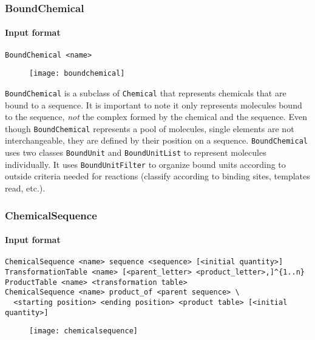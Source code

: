 \subsubsection{BoundChemical}

\paragraph{Input format}
\begin{verbatim}
BoundChemical <name>
\end{verbatim}

\begin{figure}[!ht]
	\centering
	\texttt{[image: boundchemical]}
\end{figure}

\texttt{BoundChemical} is a subclass of \texttt{Chemical} that represents chemicals that are bound to a sequence. It is important to note it only represents molecules bound to the sequence, \emph{not} the complex formed by the chemical and the sequence. Even though \texttt{BoundChemical} represents a pool of molecules, single elements are not interchangeable, they are defined by their position on a sequence. \texttt{BoundChemical} uses two classes \texttt{BoundUnit} and \texttt{BoundUnitList} to represent molecules individually. It uses \texttt{BoundUnitFilter} to organize bound units according to outside criteria needed for reactions (classify according to binding sites, templates read, etc.).

\subsubsection{ChemicalSequence}

\paragraph{Input format}
\begin{verbatim}
ChemicalSequence <name> sequence <sequence> [<initial quantity>]
TransformationTable <name> [<parent_letter> <product_letter>,]^{1..n}
ProductTable <name> <transformation table>
ChemicalSequence <name> product_of <parent sequence> \
  <starting position> <ending position> <product table> [<initial quantity>]
\end{verbatim}

\begin{figure}[!ht]
	\centering
	\texttt{[image: chemicalsequence]}
\end{figure}

